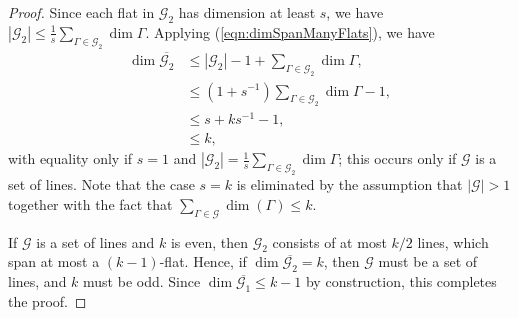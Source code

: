\documentclass{article}
\begin{document}
\begin{proof}
Since each flat in $\mathcal{G}_2$ has dimension at least $s$, we have $|\mathcal{G}_2| \leq \frac{1}{s} \sum_{\Gamma \in \mathcal{G}_2} \dim \Gamma$.
Applying (\ref{eqn:dimSpanManyFlats}), we have
\begin{align*}
\dim \overline{\mathcal{G}_2} &\leq |\mathcal{G}_2| - 1 + \sum_{\Gamma \in \mathcal{G}_2} \dim \Gamma, \\
&\leq (1 + s^{-1}) \sum_{\Gamma \in \mathcal{G}_2} \dim \Gamma - 1,\\
&\leq s + ks^{-1} - 1,\\
&\leq k,
\end{align*}
with equality only if $s=1$ and $|\mathcal{G}_2| = \frac{1}{s}\sum_{\Gamma \in \mathcal{G}_2} \dim \Gamma$; this occurs only if $\mathcal{G}$ is a set of lines.
Note that the case $s = k$ is eliminated by the assumption that $|\mathcal{G}| > 1$ together with the fact that $\sum_{\Gamma \in \mathcal{G}} \dim(\Gamma) \leq k$.

If $\mathcal{G}$ is a set of lines and $k$ is even, then $\mathcal{G}_2$ consists of at most $k/2$ lines, which span at most a $(k-1)$-flat.
Hence, if $\dim \overline{\mathcal{G}_2} = k$, then $\mathcal{G}$ must be a set of lines, and $k$ must be odd.
Since $\dim \overline{\mathcal{G}_1} \leq k-1$ by construction, this completes the proof.

\end{proof}





\end{document}
